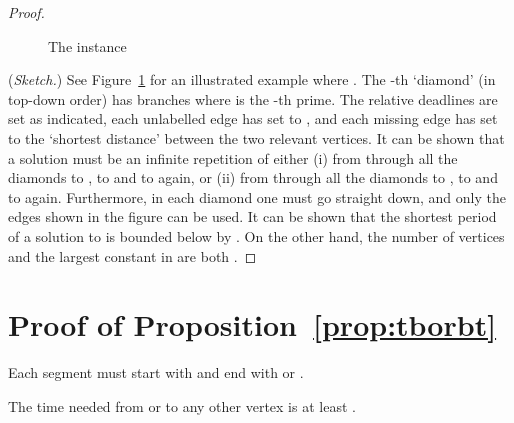 \documentclass[envcountsame]{llncs}
\begin{document}
\begin{proof}
\begin{figure}[h]
\caption{The instance }
\label{fig:prime}
\end{figure}

(\emph{Sketch.}) See Figure~\ref{fig:prime} for an illustrated example where .
The -th `diamond' (in top-down order) has  branches where  is the -th prime.
The relative deadlines are set as indicated, each unlabelled edge has  set to , and
each missing edge has  set to the `shortest distance' between the two relevant vertices.
It can be shown that a solution must be an infinite repetition of either (i) from  through all the diamonds to , to
 and to  again, or (ii) from  through all the diamonds to , to  and to  again.
Furthermore, in each diamond one must go straight down, and only the edges shown in the figure can be used.
It can be shown that the shortest period of a solution to  is bounded below by .
On the other hand, the number of vertices and the largest constant in  are both .
\end{proof}


\section{Proof of Proposition~\ref{prop:tborbt}}\label{app:tborbt}

\begin{lemma}\label{lem:toporbot}
Each segment  must start with and end with  or .
\end{lemma}


\begin{lemma}\label{lem:atleast3mp1}
The time needed from  or  to any other vertex is at least .
\end{lemma}
\end{document}
